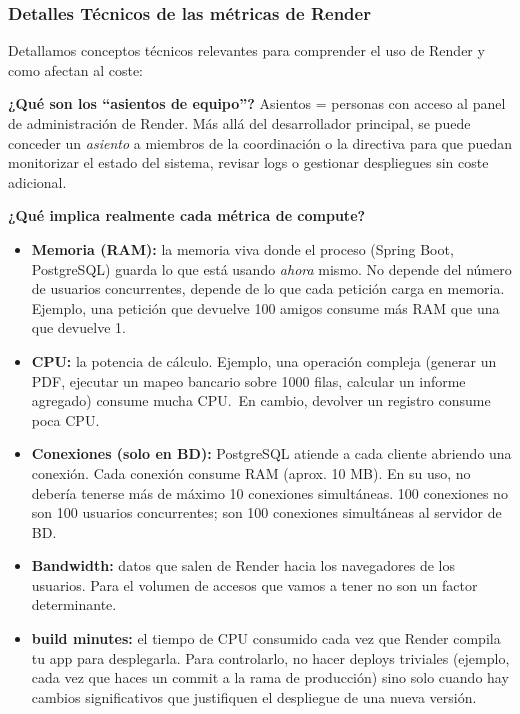 \subsubsection{Detalles Técnicos de las métricas de Render}
Detallamos conceptos técnicos relevantes para comprender el uso de Render y como afectan al coste:
\par
\vspace{5mm}
\textbf{¿Qué son los ``asientos de equipo''?} Asientos = personas con acceso al panel de administración de Render. 
Más allá del desarrollador principal, se puede conceder un \textit{asiento} a miembros de la coordinación o la directiva 
para que puedan monitorizar el estado del sistema, revisar logs o gestionar despliegues sin coste adicional.
\par
\vspace{5mm}
\textbf{¿Qué implica realmente cada métrica de compute?}
\begin{itemize}
    \item \textbf{Memoria (RAM):} la memoria viva donde el proceso (Spring Boot, PostgreSQL) guarda lo que está usando \textit{ahora} mismo.
    No depende del número de usuarios concurrentes, depende de lo que cada petición carga en memoria. Ejemplo, una petición que devuelve 100 
    amigos consume más RAM que una que devuelve 1.

    \item \textbf{CPU:} la potencia de cálculo. Ejemplo, una operación compleja (generar un PDF, ejecutar un mapeo 
    bancario sobre 1000 filas, calcular un informe agregado) consume mucha CPU.\ En cambio, devolver un registro consume poca CPU.\

    \item \textbf{Conexiones (solo en BD):} PostgreSQL atiende a cada cliente abriendo una conexión. Cada conexión consume RAM (aprox. 10 MB).
    En su uso, no debería tenerse más de máximo 10 conexiones simultáneas. 100 conexiones no son 100 usuarios concurrentes; son 100 
    conexiones simultáneas al servidor de BD.\

    \item \textbf{Bandwidth:} datos que salen de Render hacia los navegadores de los usuarios. Para el volumen de 
    accesos que vamos a tener no son un factor determinante.

    \item \textbf{build minutes:} el tiempo de CPU consumido cada vez que Render compila tu app para desplegarla. 
    Para controlarlo, no hacer deploys triviales (ejemplo, cada vez que haces un commit a la rama de producción) 
    sino solo cuando hay cambios significativos que justifiquen el despliegue de una nueva versión.
\end{itemize}

